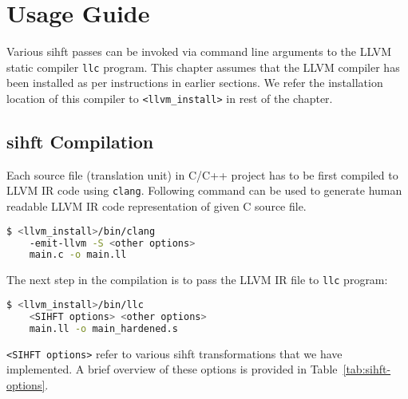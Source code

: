 

\section{Usage Guide}

Various \ac{sihft} passes can be invoked via command line arguments to the LLVM static compiler \texttt{llc} program.
This chapter assumes that the LLVM compiler has been installed as per instructions in earlier sections.
We refer the installation location of this compiler to \texttt{<llvm\_install>} in rest of the chapter.

\subsection{\ac{sihft} Compilation}
Each source file (translation unit) in C/C++ project has to be first compiled to LLVM IR code using \texttt{clang}.
Following command can be used to generate human readable LLVM IR code representation of given C source file.
\begin{framed}
 \begin{lstlisting}[language=bash, basicstyle=\small\ttfamily]
$ <llvm_install>/bin/clang
    -emit-llvm -S <other options>
    main.c -o main.ll
  \end{lstlisting}
\end{framed}

The next step in the compilation is to pass the LLVM IR file to \texttt{llc} program:\\
\begin{lstlisting}[language=bash, basicstyle=\small\ttfamily, frame=single]
$ <llvm_install>/bin/llc
    <SIHFT options> <other options>
    main.ll -o main_hardened.s
\end{lstlisting}

\texttt{<SIHFT options>} refer to various \ac{sihft} transformations that we have implemented. A brief overview of these
options is provided in Table~\ref{tab:sihft-options}.

